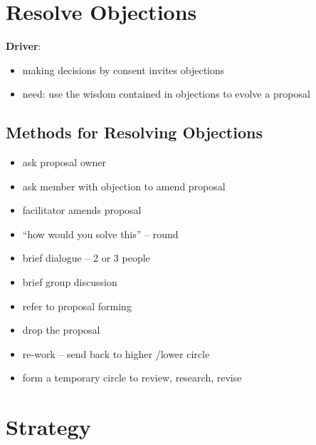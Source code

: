 \section{Resolve Objections}
\label{resolveobjections}

\textbf{Driver}:

\begin{itemize}
\item making decisions by consent invites objections

\item need: use the wisdom contained in objections to evolve a proposal

\end{itemize}

\subsection{Methods for Resolving Objections}
\label{methodsforresolvingobjections}

\begin{itemize}
\item ask proposal owner

\item ask member with objection to amend proposal

\item facilitator amends proposal

\item ``how would you solve this'' – round

\item brief dialogue – 2 or 3 people

\item brief group discussion

\item refer to proposal forming

\item drop the proposal

\item re-work – send back to higher \slash  lower circle

\item form a temporary circle to review, research, revise

\end{itemize}

\section{Strategy}
\label{strategy}

